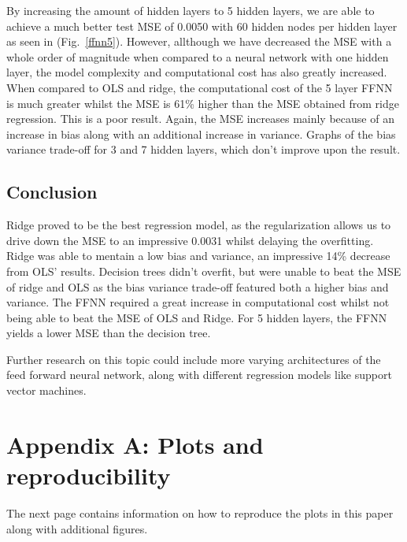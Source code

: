 \documentclass[onecolumn,10pt,cleanfoot]{asme2ej}
\begin{document}
By increasing the amount of hidden layers to 5 hidden layers, we are able to achieve a much better test MSE of 0.0050 with 60 hidden nodes per hidden layer as seen in (Fig.~\ref{ffnn5}). However, allthough we have decreased the MSE with a whole order of magnitude when compared to a neural network with one hidden layer, the model complexity and computational cost has also greatly increased. When compared to OLS and ridge, the computational cost of the 5 layer FFNN is much greater whilst the MSE is 61\% higher than the MSE obtained from ridge regression. This is a poor result. Again, the MSE increases mainly because of an increase in bias along with an additional increase in variance. Graphs of the bias variance trade-off for 3 and 7 hidden layers, which don't improve upon the result.

\subsection{Conclusion}
Ridge proved to be the best regression model, as the regularization allows us to drive down the MSE to an impressive 0.0031 whilst delaying the overfitting. Ridge was able to mentain a low bias and variance, an impressive 14\% decrease from OLS' results. Decision trees didn't overfit, but were unable to beat the MSE of ridge and OLS as the bias variance trade-off featured both a higher bias and variance. The FFNN required a great increase in computational cost whilst not being able to beat the MSE of OLS and Ridge. For 5 hidden layers, the FFNN yields a lower MSE than the decision tree.

Further research on this topic could include more varying architectures of the feed forward neural network, along with different regression models like support vector machines.




\section*{Appendix A: Plots and reproducibility}

The next page contains information on how to reproduce the plots in this paper along with additional figures.
\end{document}
